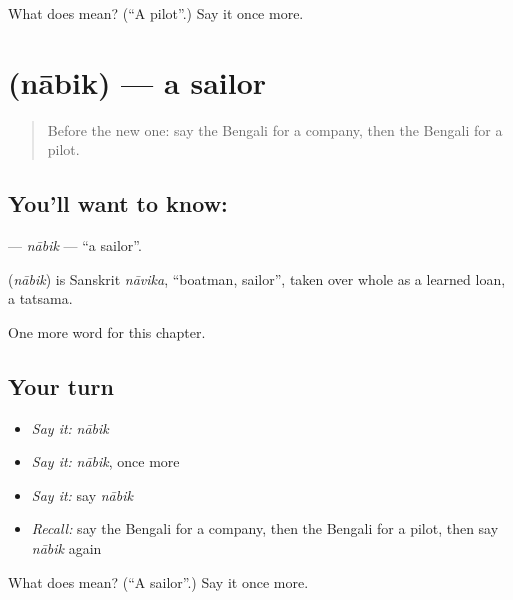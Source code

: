\begin{tcolorbox}[breakable,colback=teal!4,colframe=teal!35!black,title={Before you move on}]
What does  mean? (\textquotedblleft{}A pilot\textquotedblright{}.) Say it once more.
\end{tcolorbox}
\section[\texorpdfstring{\bn{নাবিক} (nābik)}{নাবিক (nābik)}]{ (nābik) — a sailor}

\label{lesson:BN-C208-nabik}



\begin{quote}
Before the new one: say the Bengali for a company, then the Bengali for a pilot.
\end{quote}

\subsection*{You'll want to know: }
\textbf{} — \emph{nābik} — \textquotedblleft{}a sailor\textquotedblright{}.

\begin{cousinweb}
\textbf{} (\emph{nābik}) is Sanskrit \emph{nāvika}, \textquotedblleft{}boatman, sailor\textquotedblright{}, taken over whole as a learned loan, a tatsama.
\end{cousinweb}

\begin{grammarlens}[title={What you've built}]
One more word for this chapter.
\end{grammarlens}

\subsection*{Your turn}
\begin{itemize}
\raggedright
  \item \emph{Say it:} \emph{nābik}
  \item \emph{Say it:} \emph{nābik}, once more
  \item \emph{Say it:} say \emph{nābik}
  \item \emph{Recall:} say the Bengali for a company, then the Bengali for a pilot, then say \emph{nābik} again
\end{itemize}

\begin{tcolorbox}[breakable,colback=teal!4,colframe=teal!35!black,title={Before you move on}]
What does  mean? (\textquotedblleft{}A sailor\textquotedblright{}.) Say it once more.
\end{tcolorbox}
